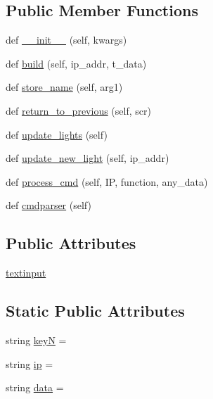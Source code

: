 \subsection*{Public Member Functions}
\begin{DoxyCompactItemize}
\item 
def \hyperlink{classGUI8_1_1Methods_aba86c23940691136e3da93a8b2e28c70}{\+\_\+\+\_\+init\+\_\+\+\_\+} (self, kwargs)
\item 
def \hyperlink{classGUI8_1_1Methods_a8dc5ac8766ebf6bcae0466c1dfd4e863}{build} (self, ip\+\_\+addr, t\+\_\+data)
\item 
def \hyperlink{classGUI8_1_1Methods_aee00254d2b626e58a413acaca6c7be85}{store\+\_\+name} (self, arg1)
\item 
def \hyperlink{classGUI8_1_1Methods_aa51f1baccfb563e106666bfdf1b5270b}{return\+\_\+to\+\_\+previous} (self, scr)
\item 
def \hyperlink{classGUI8_1_1Methods_a8ad14590b69daef6130be3f8973427d3}{update\+\_\+lights} (self)
\item 
def \hyperlink{classGUI8_1_1Methods_a76baa218c955655997f34f66dae66b40}{update\+\_\+new\+\_\+light} (self, ip\+\_\+addr)
\item 
def \hyperlink{classGUI8_1_1Methods_a46c377c8688fd2b08dc1fb5f1ea30106}{process\+\_\+cmd} (self, IP, function, any\+\_\+data)
\item 
def \hyperlink{classGUI8_1_1Methods_a5e130161d27497716d6f67fbe32f8795}{cmdparser} (self)
\end{DoxyCompactItemize}
\subsection*{Public Attributes}
\begin{DoxyCompactItemize}
\item 
\hyperlink{classGUI8_1_1Methods_a2aa43992fb1cab1c4d8d542b047ee088}{textinput}
\end{DoxyCompactItemize}
\subsection*{Static Public Attributes}
\begin{DoxyCompactItemize}
\item 
string \hyperlink{classGUI8_1_1Methods_a8525f729863e89dd50a9f74cdea594d7}{keyN} = \textquotesingle{}\textquotesingle{}
\item 
string \hyperlink{classGUI8_1_1Methods_ac5aeb0c519d44173e630d3043630d6b5}{ip} = \textquotesingle{}\textquotesingle{}
\item 
string \hyperlink{classGUI8_1_1Methods_a0a8c1e1cc0921974506ee1e86e24af9b}{data} = \textquotesingle{}\textquotesingle{}
\end{DoxyCompactItemize}


